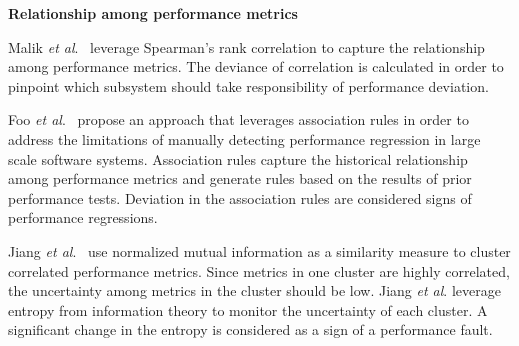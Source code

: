 %



\noindent \textbf{Relationship among performance metrics}

Malik \emph{et al$.$}~\cite{5635038} leverage Spearman's rank correlation to capture the relationship among performance metrics. The deviance of correlation is calculated in order to pinpoint which subsystem should take responsibility of performance deviation.

Foo\emph{ et al$.$}~\cite{foo2010mining} propose an approach that leverages association rules in order to address the limitations of manually detecting performance regression in large scale software systems. Association rules capture the historical relationship among performance metrics and generate rules based on the results of prior performance tests. Deviation in the association rules are considered signs of performance regressions.

Jiang \emph{et al$.$}~\cite{5270324} use normalized mutual information as a similarity measure to cluster correlated performance metrics. Since metrics in one cluster are highly correlated, the uncertainty among metrics in the cluster should be low. Jiang \emph{et al$.$} leverage entropy from information theory to monitor the uncertainty of each cluster. A significant change in the entropy is considered as a sign of a performance fault. %







